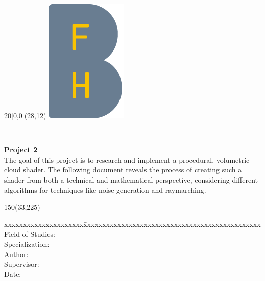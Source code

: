 
\begin{titlepage}

\setlength{\unitlength}{1mm}

\begin{textblock}{20}[0,0](28,12)
    \includegraphics[scale=1.0]{../img/BFH_Logo_B.png}
\end{textblock}

\begin{flushleft}

\vspace*{21mm}

\fontsize{26pt}{40pt}\selectfont
{\doctitle}	\\
\vspace{2mm}

\fontsize{16pt}{24pt}\selectfont\vspace{0.3em}
\docsubtitle
\vspace{5mm}

\fontsize{10pt}{12pt}\selectfont
\textbf{Project 2} \\

\fontsize{10pt}{12pt}\selectfont
The goal of this project is to research and implement a procedural, volumetric cloud shader. The following document reveals the process of creating such a shader from both a technical and mathematical perspective, considering different algorithms for techniques like noise generation and raymarching.
\begin{textblock}{150}(33,225)
\fontsize{10pt}{17pt}
\begin{tabbing}
xxxxxxxxxxxxxxxxxxxxx\=xxxxxxxxxxxxxxxxxxxxxxxxxxxxxxxxxxxxxxxxxxxxxxx \kill
Field of Studies:	\> \fieldofstudies	\\
Specialization:	    \> \specialisation	\\
Author:		        \> \docauthor \\
Supervisor:         \> \prof \\
Date:			    \> \versiondate \\
\end{tabbing}


\end{textblock}
\end{flushleft}
\end{titlepage}
